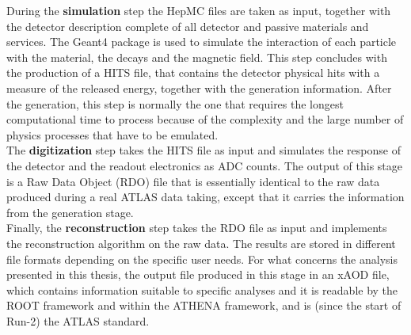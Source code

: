 \documentclass[a4paper,twoside,12pt]{article}
\begin{document}
During the \textbf{simulation} step the HepMC files are taken as input, together with
the detector description complete of all detector and passive materials and services. 
The Geant4 package\cite{Geant4} is used to simulate the interaction of each particle with the material, the decays and the
magnetic field. This
step concludes with the production of a HITS file, that contains the detector physical hits
with a measure of the released energy, together with the generation information. After
the generation, this step 
is normally the one that requires the longest computational time to process because of the
complexity and the large number of physics processes that have to be emulated.\\

The \textbf{digitization} step takes the HITS file as input and simulates the response of the 
detector and the readout electronics as ADC counts. The output of this stage is a Raw Data
Object (RDO) file that is essentially identical to the raw data produced during a real 
ATLAS data taking, except that it carries the information from the generation stage.\\

Finally, the \textbf{reconstruction} step takes the RDO file as input and implements
the reconstruction algorithm on the raw data. The results are stored in different file formats
depending on the specific user needs\cite{ATLASFormats}. For what concerns the analysis presented in this thesis,
the output file produced in this stage in an xAOD file, which contains information suitable to specific analyses and it is readable by the ROOT framework\cite {ROOT} and 
within the ATHENA framework\cite{Athena}, and is (since the start of Run-2) the ATLAS standard. \\

\end{document}
